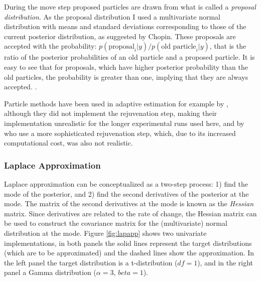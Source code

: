 \documentclass{article}\usepackage{knitr}
\begin{document}
During the move step proposed particles are drawn from what is called a \textit{proposal distribution}. As the proposal distribution I used a multivariate normal distribution with means and standard deviations corresponding to those of the current posterior distribution, as suggested by Chopin. These proposals are accepted with the probability: $p(\text{proposal}_i | y) / p(\text{old particle}_i | y)$, that is the ratio of the posterior probabilities of an old particle and a proposed particle. It is easy to see that for proposals, which have higher posterior probability than the old particles, the probability is greater than one, implying that they are always accepted. \citep{chopin2002}. 

Particle methods have been used in adaptive estimation for example by \citet{dimattina2015}, although they did not implement the rejuvenation step, making their implementation unrealistic for the longer experimental runs used here, and by  \citet{kujalalukka2006} who use a more sophisticated  rejuvenation step, which, due to its increased computational cost, was also not realistic. 

\subsubsection{Laplace Approximation}

Laplace approximation can be conceptualized as a two-step process: 1) find the mode of the posterior, and 2) find the second derivatives of the posterior at the mode. The matrix of the second derivatives at the mode is known as the \textit{Hessian} matrix. Since derivatives are related to the rate of change, the Hessian matrix can be used to construct the covariance matrix for the (multivariate) normal distribution at the mode. Figure \ref{fig:lapapp} shows two univariate implementations, in both panels the solid lines represent the target distributions (which are to be approximated) and the dashed lines show the approximation. In the left panel the target distribution is a t-distribution ($df = 1$), and in the right panel a Gamma distribution ($\alpha = 3$, $beta = 1$). 
\end{document}
